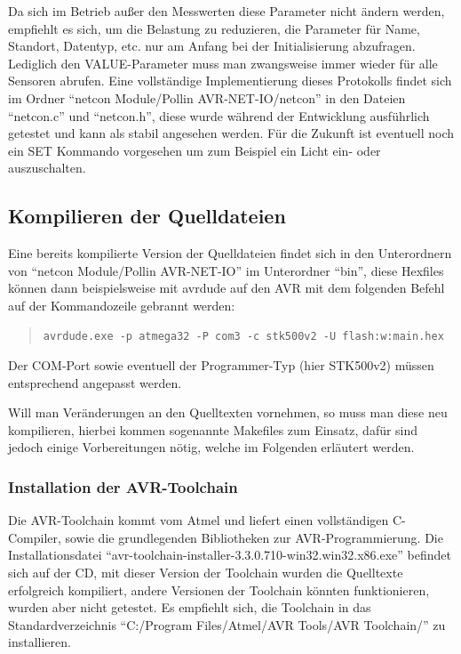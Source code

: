 \documentclass[a4paper,14pt,headsepline]{scrartcl}
\begin{document}
\newpage

Da sich im Betrieb außer den Messwerten diese Parameter nicht ändern werden, empfiehlt es sich, um die Belastung zu reduzieren, die Parameter für Name, Standort, Datentyp, etc. nur am Anfang bei der Initialisierung abzufragen. Lediglich den VALUE-Parameter muss man zwangsweise immer wieder für alle Sensoren abrufen. Eine vollständige Implementierung dieses Protokolls findet sich im Ordner "`netcon Module/Pollin AVR-NET-IO/netcon"' in den Dateien "`netcon.c"' und "`netcon.h"', diese wurde während der Entwicklung ausführlich getestet und kann als stabil angesehen werden. Für die Zukunft ist eventuell noch ein SET Kommando vorgesehen um zum Beispiel ein Licht ein- oder auszuschalten.

\newpage

\subsection{Kompilieren der Quelldateien}
Eine bereits kompilierte Version der Quelldateien findet sich in den Unterordnern von "`netcon Module/Pollin AVR-NET-IO"' im Unterordner "`bin"', diese Hexfiles können dann beispielsweise mit avrdude auf den AVR mit dem folgenden Befehl auf der Kommandozeile gebrannt werden:
\begin{quote}
\begin{verbatim}
avrdude.exe -p atmega32 -P com3 -c stk500v2 -U flash:w:main.hex
\end{verbatim}
\end{quote}

Der COM-Port sowie eventuell der Programmer-Typ (hier STK500v2) müssen entsprechend angepasst werden.

Will man Veränderungen an den Quelltexten vornehmen, so muss man diese neu kompilieren, hierbei kommen sogenannte Makefiles zum Einsatz, dafür sind jedoch einige Vorbereitungen nötig, welche im Folgenden erläutert werden.

\subsubsection{Installation der AVR-Toolchain}
Die AVR-Toolchain kommt vom Atmel und liefert einen vollständigen C-Compiler, sowie die grundlegenden Bibliotheken zur AVR-Programmierung. Die Installationsdatei "`avr-toolchain-installer-3.3.0.710-win32.win32.x86.exe"' befindet sich auf der CD, mit dieser Version der Toolchain wurden die Quelltexte erfolgreich kompiliert, andere Versionen der Toolchain könnten funktionieren, wurden aber nicht getestet. Es empfiehlt sich, die Toolchain in das Standardverzeichnis "`C:/Program Files/Atmel/AVR Tools/AVR Toolchain/"' zu installieren.
\end{document}
